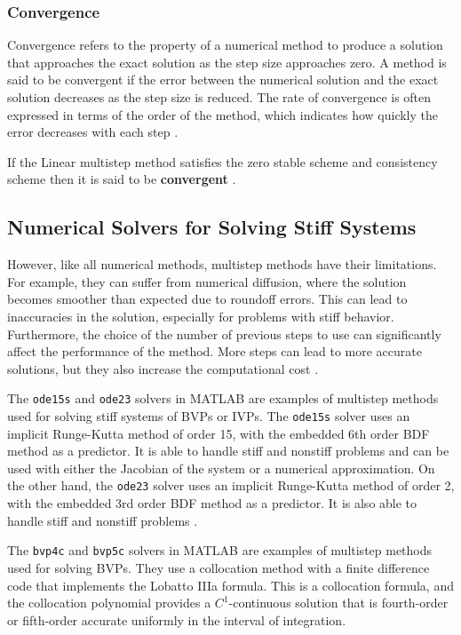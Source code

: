 \subsubsection*{Convergence} 
Convergence refers to the property of a numerical method to produce a solution that approaches the exact solution as the step size approaches zero. A method is said to be convergent if the error between the numerical solution and the exact solution decreases as the step size is reduced. The rate of convergence is often expressed in terms of the order of the method, which indicates how quickly the error decreases with each step \cite{2022JFatokunEtAl}.


If the Linear multistep method satisfies the zero stable scheme and consistency scheme then it is said to be \textbf{convergent} \cite{2022JFatokunEtAl}.


\subsection*{Numerical Solvers for Solving Stiff Systems}

However, like all numerical methods, multistep methods have their limitations. For example, they can suffer from numerical diffusion, where the solution becomes smoother than expected due to roundoff errors. This can lead to inaccuracies in the solution, especially for problems with stiff behavior. Furthermore, the choice of the number of previous steps to use can significantly affect the performance of the method. More steps can lead to more accurate solutions, but they also increase the computational cost \cite{math7121158}.

The \texttt{ode15s} and \texttt{ode23} solvers in MATLAB are examples of multistep methods used for solving stiff systems of BVPs or IVPs. The \texttt{ode15s} solver uses an implicit Runge-Kutta method of order 15, with the embedded 6th order BDF method as a predictor. It is able to handle stiff and nonstiff problems and can be used with either the Jacobian of the system or a numerical approximation. On the other hand, the \texttt{ode23} solver uses an implicit Runge-Kutta method of order 2, with the embedded 3rd order BDF method as a predictor. It is also able to handle stiff and nonstiff problems \cite{wong2020lecture}.

The \texttt{bvp4c} and \texttt{bvp5c} solvers in MATLAB are examples of multistep methods used for solving BVPs. They use a collocation method with a finite difference code that implements the Lobatto IIIa formula. This is a collocation formula, and the collocation polynomial provides a $C^1$-continuous solution that is fourth-order or fifth-order accurate uniformly in the interval of integration.

